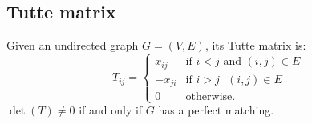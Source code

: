 \subsection*{Tutte matrix}

Given an undirected graph $G=(V, E)$, its Tutte matrix is:
\[
T_{i j} = \begin{cases} 
      x_{i j} & \text{if $i < j$ and $(i, j) \in E$} \\
      -x_{j i} & \text{if $i > j$ $(i, j) \in E$} \\
      0 & \text{otherwise.}
   \end{cases}
\]
$\det(T) \ne 0$ if and only if $G$ has a perfect matching.

